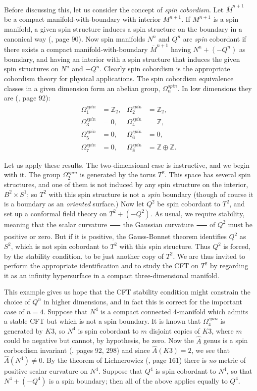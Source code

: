 \documentclass[a4paper,12pt]{article}
\newcommand{\field}[1]{\mathbb{#1}}
\newcommand{\Z}{\field{Z}}
\theoremstyle{definition}
\renewcommand{\u}{\textit}
\renewcommand{\-}{$\dfrac{\quad\enspace}{\quad}$}
\begin{document}
Before discussing this, let us consider the concept of \u{spin cobordism}. Let $\overline{M}^{n+1}$ be a compact manifold-with-boundary with interior $M^{n+1}$. If $M^{n+1}$ is a spin manifold, a given spin structure induces a spin structure on the boundary in a canonical way (\cite{12}, page 90). Now spin manifolds $N^n$ and $Q^n$ are \u{spin} cobordant if there exists a compact manifold-with-boundary $\overline{M}^{n+1}$ having $N^n+(-Q^n)$ as boundary, and having an interior with a spin structure that induces the given spin structures on $N^n$ and $-Q^n$. Clearly spin cobordism is the appropriate cobordism theory for physical applications. The spin cobordism equivalence classes in a given dimension form an abelian group, $\Omega^{spin}_n$. In low dimensions they are (\cite{12}, page 92):
\begin{align}
\Omega^{spin}_1&=\Z_2,&\Omega^{spin}_2&=\Z_2,\\
\Omega^{spin}_3&=0,&\Omega^{spin}_4&=\Z, \nonumber\\
\Omega^{spin}_5&=0,&\Omega^{spin}_6&=0,\nonumber\\
\Omega^{spin}_7&=0,&\Omega^{spin}_8&=\Z\oplus\Z.\nonumber
\end{align}

Let us apply these results. The two-dimensional case is instructive, and we begin with it. The group $\Omega^{spin}_2$ is generated by the torus $T^2$. This space has several spin structures, and one of them is not induced by any spin structure on the interior, $B^2\times S^1$; so $T^2$ with this spin structure is not a \u{spin} boundary (though of course it is a boundary as an \u{oriented} surface.) Now let $Q^2$ be spin cobordant to $T^2$, and set up a conformal field theory on $T^2+(-Q^2)$. As usual, we require stability, meaning that the scalar curvature \- the Gaussian curvature \- of $Q^2$ must be positive or zero. But if it is positive, the Gauss-Bonnet theorem identifies $Q^2$ as $S^2$, which is not spin cobordant to $T^2$ with this spin structure. Thus $Q^2$ is forced, by the stability condition, to be just another copy of $T^2$. We are thus invited to perform the appropriate identification and to study the CFT on $T^2$ by regarding it as an infinity hypersurface in a compact three-dimensional manifold.

This example gives us hope that the CFT stability condition might constrain the choice of $Q^n$ in higher dimensions, and in fact this is correct for the important case of $n=4$. Suppose that $N^4$ is a compact connected 4-manifold which admits a stable CFT but which is not a spin boundary. It is known that $\Omega^{spin}_4$ is generated by $K3$, so $N^4$ is spin cobordant to $m$ disjoint copies of $K3$, where $m$ could be negative but cannot, by hypothesis, be zero. Now the $\hat{A}$ genus is a spin corbordism invariant (\cite{12}. pages 92, 298) and since $\hat{A}(K3)=2$, we see that $\hat{A}(N^4)\not=0$. By the theorem of Lichnerowicz (\cite{12}, page 161) there is \u{no} metric of positive scalar curvature on $N^4$. Suppose that $Q^4$ is spin cobordant to $N^4$, so that $N^4+(-Q^4)$ is a spin boundary; then all of the above applies equally to $Q^4$.
\end{document}
